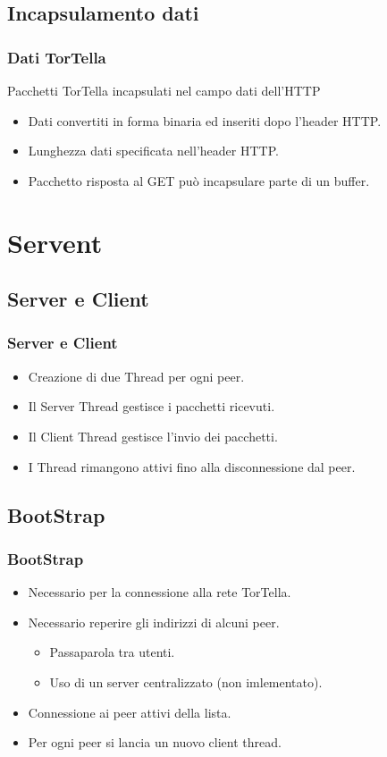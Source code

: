 \documentclass[a4paper,italian,12pt]{beamer}
\begin{document}
		\subsection{Incapsulamento dati}
			\begin{frame}
				\frametitle{Dati TorTella}
				\begin{beamerboxesrounded}[upper=palette primary,lower=palette primary,shadow=true]{ }
					Pacchetti TorTella incapsulati nel campo dati dell'HTTP
				\end{beamerboxesrounded}
				\begin{itemize}
					\item Dati convertiti in forma binaria ed inseriti dopo l'header HTTP.
					\item Lunghezza dati specificata nell'header HTTP.
					\item Pacchetto risposta al GET può incapsulare parte di un buffer.
				\end{itemize}
			\end{frame}
    \section{Servent}
    	\subsection{Server e Client}
			\frame
    		{
   				\frametitle{Server e Client}
    			\begin{itemize}	
	   				\item Creazione di due Thread per ogni peer.
					\item Il Server Thread gestisce i pacchetti ricevuti.
					\item Il Client Thread gestisce l'invio dei pacchetti.
					\item I Thread rimangono attivi fino alla disconnessione dal peer.
				\end{itemize}
   			}
   		\subsection{BootStrap}
   			\frame
	   		{
	   			\frametitle{BootStrap}
	   			\begin{itemize}
	   				\item Necessario per la connessione alla rete TorTella.
	   				\item Necessario reperire gli indirizzi di alcuni peer.
	   					\begin{itemize}
	   						\item Passaparola tra utenti.
	   						\item Uso di un server centralizzato (non imlementato).
	   					\end{itemize}
	   				\item Connessione ai peer attivi della lista.
	   				\item Per ogni peer si lancia un nuovo client thread.
	   			\end{itemize}
	   		}
\end{document}
